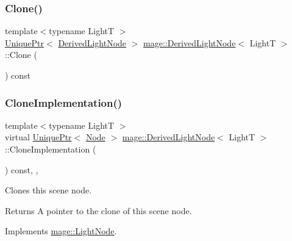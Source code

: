 \subsubsection{\texorpdfstring{Clone()}{Clone()}}
{\footnotesize\ttfamily template$<$typename LightT $>$ \\
\hyperlink{namespacemage_a8c307fbcc33bce9b7f2aa4c26c3b95cf}{Unique\+Ptr}$<$ \hyperlink{classmage_1_1_derived_light_node}{Derived\+Light\+Node} $>$ \hyperlink{classmage_1_1_derived_light_node}{mage\+::\+Derived\+Light\+Node}$<$ LightT $>$\+::Clone (\begin{DoxyParamCaption}{ }\end{DoxyParamCaption}) const}

\hypertarget{classmage_1_1_derived_light_node_acf8858989780bf45a45c55a7c5564314}{}\label{classmage_1_1_derived_light_node_acf8858989780bf45a45c55a7c5564314} 
\subsubsection{\texorpdfstring{Clone\+Implementation()}{CloneImplementation()}}
{\footnotesize\ttfamily template$<$typename LightT $>$ \\
virtual \hyperlink{namespacemage_a8c307fbcc33bce9b7f2aa4c26c3b95cf}{Unique\+Ptr}$<$ \hyperlink{classmage_1_1_node}{Node} $>$ \hyperlink{classmage_1_1_derived_light_node}{mage\+::\+Derived\+Light\+Node}$<$ LightT $>$\+::Clone\+Implementation (\begin{DoxyParamCaption}{ }\end{DoxyParamCaption}) const\hspace{0.3cm}{\ttfamily [override]}, {\ttfamily [private]}, {\ttfamily [virtual]}}

Clones this scene node.

\begin{DoxyReturn}{Returns}
A pointer to the clone of this scene node. 
\end{DoxyReturn}


Implements \hyperlink{classmage_1_1_light_node_aea97601d0a4b8073a1c655ca334af242}{mage\+::\+Light\+Node}.

\hypertarget{classmage_1_1_derived_light_node_a1f45fa421b75d663a360bfdd518a1a1d}{}\label{classmage_1_1_derived_light_node_a1f45fa421b75d663a360bfdd518a1a1d} 
